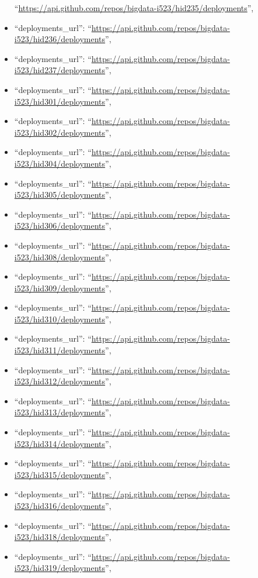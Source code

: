 \begin{itemize}
  ``\url{https://api.github.com/repos/bigdata-i523/hid235/deployments}'',
\item
  ``deployments\_url'':
  ``\url{https://api.github.com/repos/bigdata-i523/hid236/deployments}'',
\item
  ``deployments\_url'':
  ``\url{https://api.github.com/repos/bigdata-i523/hid237/deployments}'',
\item
  ``deployments\_url'':
  ``\url{https://api.github.com/repos/bigdata-i523/hid301/deployments}'',
\item
  ``deployments\_url'':
  ``\url{https://api.github.com/repos/bigdata-i523/hid302/deployments}'',
\item
  ``deployments\_url'':
  ``\url{https://api.github.com/repos/bigdata-i523/hid304/deployments}'',
\item
  ``deployments\_url'':
  ``\url{https://api.github.com/repos/bigdata-i523/hid305/deployments}'',
\item
  ``deployments\_url'':
  ``\url{https://api.github.com/repos/bigdata-i523/hid306/deployments}'',
\item
  ``deployments\_url'':
  ``\url{https://api.github.com/repos/bigdata-i523/hid308/deployments}'',
\item
  ``deployments\_url'':
  ``\url{https://api.github.com/repos/bigdata-i523/hid309/deployments}'',
\item
  ``deployments\_url'':
  ``\url{https://api.github.com/repos/bigdata-i523/hid310/deployments}'',
\item
  ``deployments\_url'':
  ``\url{https://api.github.com/repos/bigdata-i523/hid311/deployments}'',
\item
  ``deployments\_url'':
  ``\url{https://api.github.com/repos/bigdata-i523/hid312/deployments}'',
\item
  ``deployments\_url'':
  ``\url{https://api.github.com/repos/bigdata-i523/hid313/deployments}'',
\item
  ``deployments\_url'':
  ``\url{https://api.github.com/repos/bigdata-i523/hid314/deployments}'',
\item
  ``deployments\_url'':
  ``\url{https://api.github.com/repos/bigdata-i523/hid315/deployments}'',
\item
  ``deployments\_url'':
  ``\url{https://api.github.com/repos/bigdata-i523/hid316/deployments}'',
\item
  ``deployments\_url'':
  ``\url{https://api.github.com/repos/bigdata-i523/hid318/deployments}'',
\item
  ``deployments\_url'':
  ``\url{https://api.github.com/repos/bigdata-i523/hid319/deployments}'',

\end{itemize}
